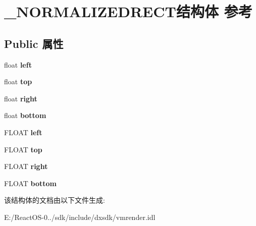 \hypertarget{struct___n_o_r_m_a_l_i_z_e_d_r_e_c_t}{}\section{\+\_\+\+N\+O\+R\+M\+A\+L\+I\+Z\+E\+D\+R\+E\+C\+T结构体 参考}
\label{struct___n_o_r_m_a_l_i_z_e_d_r_e_c_t}
\subsection*{Public 属性}
\begin{DoxyCompactItemize}
\item 
\mbox{\label{struct___n_o_r_m_a_l_i_z_e_d_r_e_c_t_a62cbae4f646da4619a7bdf98bdd60600}} 
float {\bfseries left}
\item 
\mbox{\label{struct___n_o_r_m_a_l_i_z_e_d_r_e_c_t_aff306a4bd835ee5779654c3cef0c93ec}} 
float {\bfseries top}
\item 
\mbox{\label{struct___n_o_r_m_a_l_i_z_e_d_r_e_c_t_a17bb2ff9a3859d39396fa55cb31a8bc3}} 
float {\bfseries right}
\item 
\mbox{\label{struct___n_o_r_m_a_l_i_z_e_d_r_e_c_t_a20ff3eb75652200baab3bde38009f0b4}} 
float {\bfseries bottom}
\item 
\mbox{\label{struct___n_o_r_m_a_l_i_z_e_d_r_e_c_t_abaea84539200a87dcdd133a33a7f548c}} 
F\+L\+O\+AT {\bfseries left}
\item 
\mbox{\label{struct___n_o_r_m_a_l_i_z_e_d_r_e_c_t_a5e4495659e47e3194f34c2a99960f606}} 
F\+L\+O\+AT {\bfseries top}
\item 
\mbox{\label{struct___n_o_r_m_a_l_i_z_e_d_r_e_c_t_a1e623f466e24207e2988621e9d89ad98}} 
F\+L\+O\+AT {\bfseries right}
\item 
\mbox{\label{struct___n_o_r_m_a_l_i_z_e_d_r_e_c_t_a39b5128e51f2a35f46100247ef87d11c}} 
F\+L\+O\+AT {\bfseries bottom}
\end{DoxyCompactItemize}


该结构体的文档由以下文件生成\+:\begin{DoxyCompactItemize}
\item 
E\+:/\+React\+O\+S-\/0../sdk/include/dxsdk/vmrender.\+idl\end{DoxyCompactItemize}
